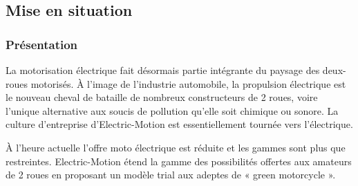 \documentclass[10pt,fleqn]{article} %
\begin{document}

\vspace{5cm}
\pagestyle{fancy}
\thispagestyle{plain}

\def\columnseprulecolor{\color{ocre}}
\setlength{\columnseprule}{0.4pt} 

\def\pathfig{images}

\begin{multicols}{2}


\subsection*{Mise en situation}
\subsubsection*{Présentation}
La motorisation électrique fait désormais partie intégrante du paysage des deux-roues motorisés.
À l'image de l'industrie automobile, la propulsion électrique est le nouveau cheval de bataille de nombreux
constructeurs de 2 roues, voire l'unique alternative aux soucis de pollution qu’elle soit chimique ou sonore. La
culture d’entreprise d’Electric-Motion est essentiellement tournée vers l’électrique.

À l’heure actuelle l’offre moto électrique est réduite et les gammes sont plus que restreintes.
Electric-Motion étend la gamme des possibilités offertes aux amateurs de 2 roues en proposant un modèle trial
aux adeptes de « green motorcycle ».


\end{multicols}
\end{document}
